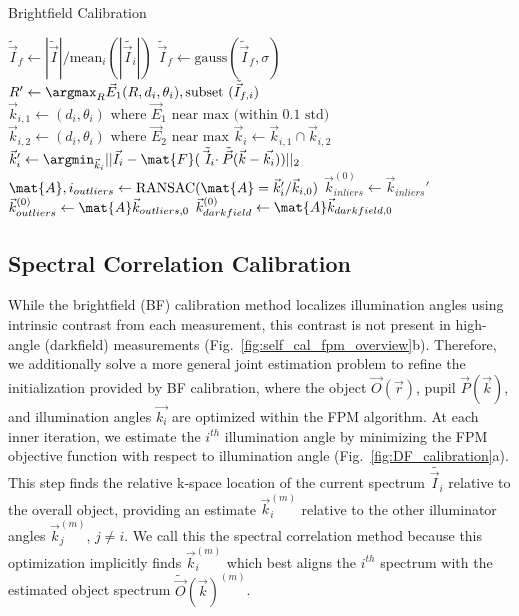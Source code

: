 \begin{algorithm}
\caption{Brightfield Calibration}\label{alg:BF}
\begin{algorithmic}[1]
\State $\tilde{\vec{I}}_f \gets |\tilde{\vec{I}}|/\textrm{mean}_i(|\tilde{\vec{I}_i}|)$\label{alg:1}
\State $\tilde{\vec{I}}_f \gets \textrm{gauss}(\tilde{\vec{I}}_f,\sigma)$\label{alg:2}
\State $R' \gets \argmax_R \vec{E}_1(R,d_i,\theta_i), \textrm{subset }(\tilde{\vec{I}}_{f,i})$\label{alg:3}
\State $\vec{k}_{i,1} \gets (d_i,\theta_i) \textrm{ where } \vec{E}_1 \textrm{ near max (within 0.1 std)}$\label{alg:5}
\State $\vec{k}_{i,2} \gets (d_i,\theta_i) \textrm{ where } \vec{E}_2 \textrm{ near max}$
\State $\vec{k}_{i} \gets \vec{k}_{i,1} \cap \vec{k}_{i,2}$
\State $\vec{k}_i' \gets \argmin_{\vec{k}_i} ||\vec{I}_i - \mat{F}(\tilde{\vec{I}_i}\cdot\tilde{\vec{P}}(\vec{k}-\vec{k_i}))||_2$ 
\EndFor \label{alg:8}
\State $\mat{A}, i_{outliers} \gets \textrm{RANSAC}(\mat{A}=\vec{k}_i'/\vec{k}_{i,0})$ \label{alg:9}
\State $\vec{k}_{inliers}^{(0)} \gets \vec{k}_{inliers}'$
\State $\vec{k}_{outliers}^{(0)} \gets \mat{A}\vec{k}_{outliers,0}$
\State $\vec{k}_{darkfield}^{(0)} \gets \mat{A}\vec{k}_{darkfield,0}$ \label{alg:12}

\end{algorithmic}
\end{algorithm}

\subsection{Spectral Correlation Calibration}
While the brightfield (BF) calibration method localizes illumination angles using intrinsic contrast from each measurement, this contrast is not present in high-angle (darkfield) measurements (Fig.~\ref{fig:self_cal_fpm_overview}b). Therefore, we additionally solve a more general joint estimation problem to refine the initialization provided by BF calibration, where the object $\vec{O}(\vec{r})$, pupil $\vec{P}(\vec{k})$, and illumination angles $\vec{k_i}$ are optimized within the FPM algorithm. At each inner iteration, we estimate the $i^{th}$ illumination angle by minimizing the FPM objective function with respect to illumination angle (Fig.~\ref{fig:DF_calibration}a). This step finds the relative k-space location of the current spectrum $\tilde{\vec{I}_i}$ relative to the overall object, providing an estimate $\vec{k}_i^{(m)}$ relative to the other illuminator angles $\vec{k}^{(m)}_j$, $j\neq i$. We call this the spectral correlation method because this optimization implicitly finds $\vec{k}_i^{(m)}$ which best aligns the $i^{th}$ spectrum with the estimated object spectrum $\tilde{\vec{O}}(\vec{k})^{(m)}$.

